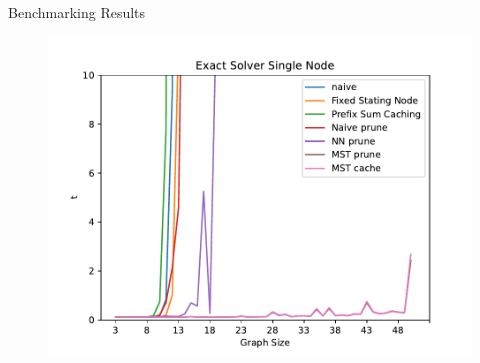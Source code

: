 \begin{frame}{Benchmarking Results}
  \vspace{-0.25cm}
  \begin{figure}
    \includegraphics[width=\linewidth,height=.9\textheight,keepaspectratio]{./assets/v6.pdf}
  \end{figure}
\end{frame}

